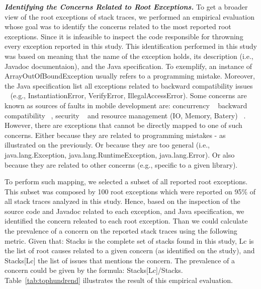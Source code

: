 \documentclass[conference]{IEEEtran}
\begin{document}
\emph{\textbf{Identifying the Concerns Related to Root Exceptions.}} To get a broader view of the root exceptions of stack traces,
 we performed an empirical evaluation whose goal was to identify the concerns related to the most reported root exceptions. 
Since it is infeasible to inspect the code responsible for throwning every exception reported in this study.
This identification performed in this study was based on meaning that the name of the exception holds, 
its description (i.e., Javadoc documentaion), and the Java specification. To exemplify, an instance of ArrayOutOfBoundException
 usually refers to a programming mistake. Moreover, the Java specification list all exceptions related to backward compatibility 
issues ~\cite{javaback} (e.g., InstantiationError, VerifyError, IllegalAccessError). Some concerns are known as sources 
of faults in mobile development are: concurrency ~\cite{ama2012} backward compatibility  
~\cite{McDon13}, security  ~\cite{enck2011study,was2010} and resource management (IO, Memory, Batery) ~\cite{Zhang12}.
However, there are exceptions that cannot be directly mapped to one of such concerns. Either because they are
related to programming mistakes - as illustrated on the previously. Or because they are too general (i.e.,  java.lang.Exception,
java.lang.RuntimeException, java.lang.Error). Or also because they are related to other concerns (e.g., specific to a given library).


To perform such mapping, we selected a subset of all reported root exceptions. This subset was composed by 100 root exceptions 
which were reported on 95\% of all stack traces analyzed in this study. Hence, based on the inspection of the source code and
 Javadoc related to each exception,  and Java specification, we identified the concern
releated to each root exception. Than we could calculate the prevalence of a concern on the reported stack traces using the following metric.
Given that: Stacks is the complete set of stacks found in this study, Lc is the list of root causes related to a given concern (as identified on the study),
 and Stacks[Lc] the list of issues that mentions the concern. The prevalence of a concern could be given by the formula: Stacks[Lc]/Stacks. 
Table~\ref{tab:tophundrend} illustrates the result of this empirical evaluation.
\end{document}

